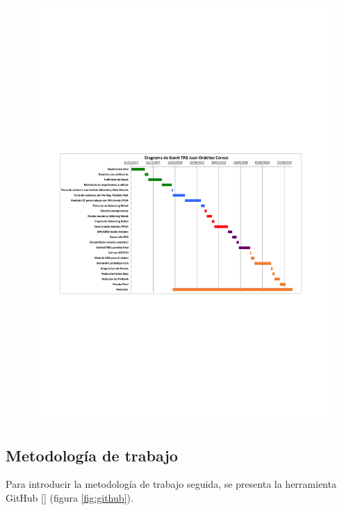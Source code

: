 \begin{center}
	\begin{figure}[H]
		\center
		\includegraphics[trim = 15mm 85mm 2cm 100mm,clip, angle=-90, scale = 1]{imagenes/Introduction/Gantt.pdf}
		\label{fig:diagramaGantt}
		\caption{}
	\end{figure}
\end{center}

\subsection{Metodología de trabajo}
Para introducir la metodología de trabajo seguida, se presenta la herramienta GitHub [] (figura \ref{fig:github}).\newline 

